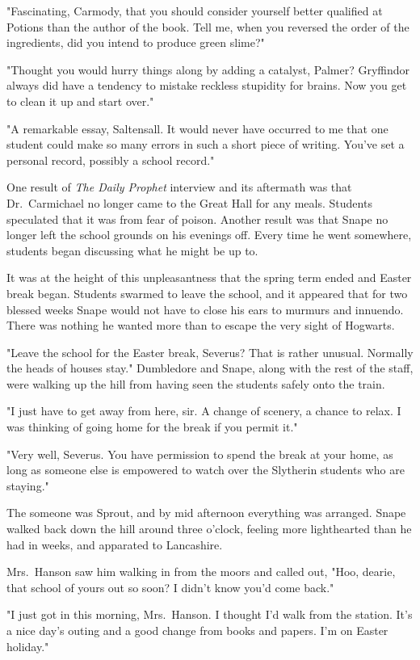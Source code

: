 "Fascinating, Carmody, that you should consider yourself better qualified at Potions than the author of the book. Tell me, when you reversed the order of the ingredients, did you intend to produce green slime?"

"Thought you would hurry things along by adding a catalyst, Palmer? Gryffindor always did have a tendency to mistake reckless stupidity for brains. Now you get to clean it up and start over."

"A remarkable essay, Saltensall. It would never have occurred to me that one student could make so many errors in such a short piece of writing. You've set a personal record, possibly a school record."

One result of \emph{The Daily Prophet} interview and its aftermath was that Dr.~Carmichael no longer came to the Great Hall for any meals. Students speculated that it was from fear of poison. Another result was that Snape no longer left the school grounds on his evenings off. Every time he went somewhere, students began discussing what he might be up to.

It was at the height of this unpleasantness that the spring term ended and Easter break began. Students swarmed to leave the school, and it appeared that for two blessed weeks Snape would not have to close his ears to murmurs and innuendo. There was nothing he wanted more than to escape the very sight of Hogwarts.

"Leave the school for the Easter break, Severus? That is rather unusual. Normally the heads of houses stay." Dumbledore and Snape, along with the rest of the staff, were walking up the hill from having seen the students safely onto the train.

"I just have to get away from here, sir. A change of scenery, a chance to relax. I was thinking of going home for the break if you permit it."

"Very well, Severus. You have permission to spend the break at your home, as long as someone else is empowered to watch over the Slytherin students who are staying."

The someone was Sprout, and by mid afternoon everything was arranged. Snape walked back down the hill around three o'clock, feeling more lighthearted than he had in weeks, and apparated to Lancashire.

Mrs.~Hanson saw him walking in from the moors and called out, "Hoo, dearie, that school of yours out so soon? I didn't know you'd come back."

"I just got in this morning, Mrs.~Hanson. I thought I'd walk from the station. It's a nice day's outing and a good change from books and papers. I'm on Easter holiday."

